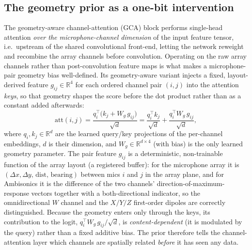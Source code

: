 \subsection{The geometry prior as a one-bit intervention}
\label{sec:gca}
The geometry-aware channel-attention (GCA) block performs single-head attention
\emph{over the microphone-channel dimension} of the input feature tensor, i.e.\
upstream of the shared convolutional front-end, letting the network reweight and
recombine the array channels before convolution. Operating on the raw array
channels rather than post-convolution feature maps is what makes a
microphone-pair geometry bias well-defined. Its geometry-aware variant injects a
fixed, layout-derived feature $g_{ij}\in\mathbb{R}^4$ for each ordered channel
pair $(i,j)$ into the attention \emph{keys}, so that geometry shapes the score
before the dot product rather than as a constant added afterwards:
\begin{equation}
  \mathrm{att}(i,j) = \frac{q_i^\top\!\bigl(k_j + W_g\,g_{ij}\bigr)}{\sqrt{d}}
  = \frac{q_i^\top k_j}{\sqrt{d}} + \frac{q_i^\top W_g\,g_{ij}}{\sqrt{d}},
  \label{eq:gca}
\end{equation}
where $q_i,k_j\in\mathbb{R}^d$ are the learned query/key projections of the
per-channel embeddings, $d$ is their dimension, and $W_g\in\mathbb{R}^{d\times4}$
(with bias) is the only learned geometry parameter. The pair feature $g_{ij}$ is a
deterministic, non-trainable function of the array layout (a registered buffer):
for the microphone array it is $(\Delta x,\Delta y,\,\text{dist},\,\text{bearing})$
between mics $i$ and $j$ in the array plane, and for Ambisonics it is the
difference of the two channels' direction-of-maximum-response vectors together with
a both-directional indicator, so the omnidirectional $W$ channel and the $X/Y/Z$
first-order dipoles are correctly distinguished. Because the geometry enters only
through the keys, its contribution to the logit, $q_i^\top W_g\,g_{ij}/\sqrt{d}$,
is \emph{content-dependent} (it is modulated by the query) rather than a fixed
additive bias. The prior therefore tells the channel-attention
layer which channels are spatially related \emph{before} it has seen any data.

